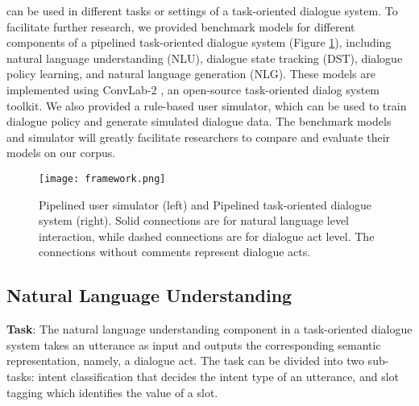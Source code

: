 \textbf{\datasetName} can be used in different tasks or settings of a task-oriented dialogue system. To facilitate further research,
we provided benchmark models for different components of a pipelined task-oriented dialogue system (Figure \ref{fig:framework}), including natural language understanding (NLU), dialogue state tracking (DST), dialogue policy learning, and natural language generation (NLG). 
These models are implemented using ConvLab-2 \cite{zhu2020convlab2}, an open-source task-oriented dialog system toolkit.
We also provided a rule-based user simulator, which can be used to train dialogue policy and generate simulated dialogue data.
The benchmark models and simulator will greatly facilitate researchers to compare and evaluate their models on our corpus.

\begin{figure}[h]
    \centering
    \texttt{[image: framework.png]}
    \caption{
    Pipelined user simulator (left) and Pipelined task-oriented dialogue system (right). Solid connections are for natural language level interaction, while dashed connections are for dialogue act level. The connections without comments represent dialogue acts.
    }
    \label{fig:framework}
\end{figure}

\subsection{Natural Language Understanding}
\textbf{Task}:
The natural language understanding component in a task-oriented dialogue system takes an utterance as input and outputs the corresponding semantic representation, namely, a dialogue act. The task can be divided into two sub-tasks: intent classification that decides the intent type of an utterance, and slot tagging which identifies the value of a slot.\\

